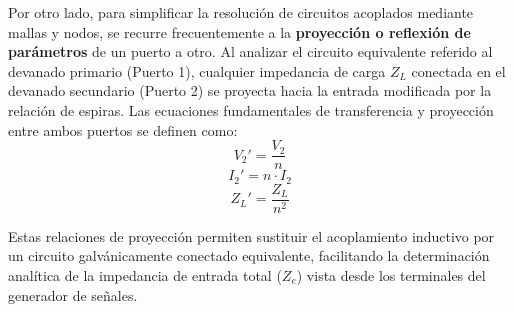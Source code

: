 Por otro lado, para simplificar la resolución de circuitos acoplados mediante mallas y nodos, se recurre frecuentemente a la \textbf{proyección o reflexión de parámetros} de un puerto a otro. Al analizar el circuito equivalente referido al devanado primario (Puerto 1), cualquier impedancia de carga $Z_L$ conectada en el devanado secundario (Puerto 2) se proyecta hacia la entrada modificada por la relación de espiras. Las ecuaciones fundamentales de transferencia y proyección entre ambos puertos se definen como:
\begin{equation}
    V_2' = \frac{V_2}{n}
\end{equation}
\begin{equation}
    I_2' = n \cdot I_2
\end{equation}
\begin{equation}
    Z_L' = \frac{Z_L}{n^2}
\end{equation}

Estas relaciones de proyección permiten sustituir el acoplamiento inductivo por un circuito galvánicamente conectado equivalente, facilitando la determinación analítica de la impedancia de entrada total ($Z_e$) vista desde los terminales del generador de señales.

\newpage
